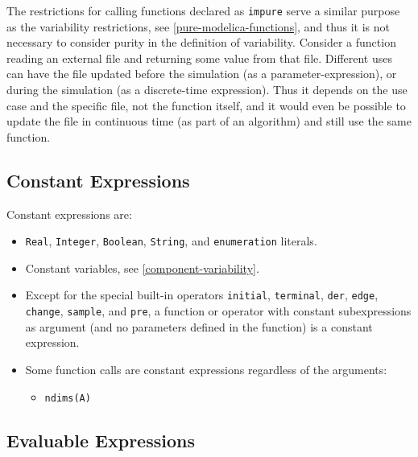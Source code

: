 \begin{nonnormative}
The restrictions for calling functions declared as \lstinline!impure! serve a similar purpose as the variability restrictions, see \cref{pure-modelica-functions}, and thus it is not necessary to consider purity in the definition of variability.
Consider a function reading an external file and returning some value from that file.
Different uses can have the file updated before the simulation (as a parameter-expression), or during the simulation (as a discrete-time expression).
Thus it depends on the use case and the specific file, not the function itself, and it would even be possible to update the file in continuous time (as part of an algorithm) and still use the same function.
\end{nonnormative}

\subsection{Constant Expressions}\label{constant-expressions}

Constant expressions are:
\begin{itemize}
\item
  \lstinline!Real!, \lstinline!Integer!, \lstinline!Boolean!, \lstinline!String!, and \lstinline!enumeration! literals.
\item
  Constant variables, see \cref{component-variability}.
\item
  Except for the special built-in operators \lstinline!initial!, \lstinline!terminal!, \lstinline!der!,
  \lstinline!edge!, \lstinline!change!, \lstinline!sample!, and \lstinline!pre!, a function or operator with constant
  subexpressions as argument (and no parameters defined in the function)
  is a constant expression.
\item
  Some function calls are constant expressions regardless of the arguments:
  \begin{itemize}
  \item
    \lstinline!ndims(A)!
  \end{itemize}
\end{itemize}

\subsection{Evaluable Expressions}\label{evaluable-expressions}

